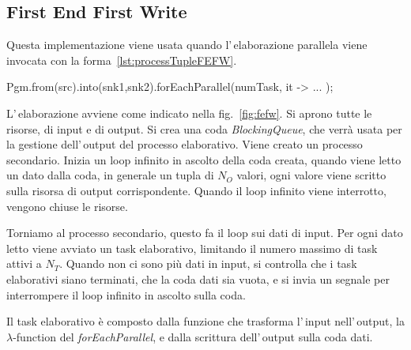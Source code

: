 \subsection{First End First Write} \label{sec:fefw}
Questa implementazione viene usata quando l'\,elaborazione parallela viene
invocata con la forma~\ref{lst:processTupleFEFW}.
\begin{elisting}[!htb]
    \begin{javacode}
        Pgm.from(src).into(snk1,snk2).forEachParallel(numTask, it -> { ... });
    \end{javacode}
    \caption{elaborazione $1\mapsto N$ (FEFW)}
    \label{lst:processTupleFEFW}
\end{elisting}

L'\,ela\-bo\-ra\-zio\-ne avviene come indicato nella fig.~\ref{fig:fefw}.
Si aprono tutte le risorse, di input e di output.
Si crea una coda \textsl{Block\-ing\-Que\-ue}, che verrà usata per la gestione
dell'\,output del processo elaborativo.
Viene creato un processo secondario.
Inizia un loop infinito in ascolto della coda creata,
quando viene letto un dato dalla coda, in generale un tupla di $N_O$ valori,
ogni valore viene scritto sulla risorsa di output corrispondente.
Quando il loop infinito viene interrotto, vengono chiuse le risorse.

Torniamo al processo secondario, questo fa il loop sui dati di input.
Per ogni dato letto viene avviato un task elaborativo,
limitando il numero massimo di task attivi a $N_T$.
Quando non ci sono più dati in input, si controlla che i task elaborativi
siano terminati, che la coda dati sia vuota, e si invia un segnale per
interrompere il loop infinito in ascolto sulla coda.

Il task elaborativo è composto dalla funzione che trasforma l'\,input
nell'\,output, la $\lambda$-function del \textsl{forEachParallel}, e
dalla scrittura dell'\,output sulla coda dati.

